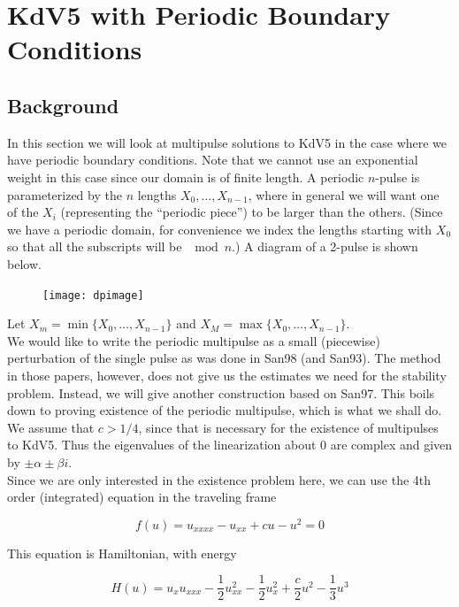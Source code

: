 \documentclass[12pt]{article}
\begin{document}
\section{KdV5 with Periodic Boundary Conditions}

\subsection{Background}

In this section we will look at multipulse solutions to KdV5 in the case where we have periodic boundary conditions. Note that we cannot use an exponential weight in this case since our domain is of finite length. A periodic $n$-pulse is parameterized by the $n$ lengths $X_0, \dots, X_{n-1}$, where in general we will want one of the $X_i$ (representing the ``periodic piece'') to be larger than the others. (Since we have a periodic domain, for convenience we index the lengths starting with $X_0$ so that all the subscripts will be $\mod n$.) A diagram of a 2-pulse is shown below.

\begin{figure}[H]
\texttt{[image: dpimage]}
\end{figure}

Let $X_m = \min \{ X_0, \dots, X_{n-1} \}$ and $X_M = \max \{ X_0, \dots, X_{n-1} \}$.\\

We would like to write the periodic multipulse as a small (piecewise) perturbation of the single pulse as was done in San98 (and San93). The method in those papers, however, does not give us the estimates we need for the stability problem. Instead, we will give another construction based on San97. This boils down to proving existence of the periodic multipulse, which is what we shall do. We assume that $c > 1/4$, since that is necessary for the existence of multipulses to KdV5. Thus the eigenvalues of the linearization about $0$ are complex and given by $\pm \alpha \pm \beta i$.\\

Since we are only interested in the existence problem here, we can use the 4th order (integrated) equation in the traveling frame

\begin{equation}\label{4thorder}
f(u) = u_{xxxx} - u_{xx} + c u - u^2 = 0
\end{equation}

This equation is Hamiltonian, with energy 

\begin{equation}\label{4thorderE}
H(u) = u_x u_{xxx} - \frac{1}{2}u_{xx}^2 - \frac{1}{2}u_x^2 + \frac{c}{2}u^2 - \frac{1}{3}u^3
\end{equation}
\end{document}
